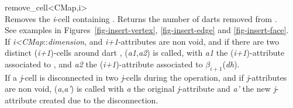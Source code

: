 \begin{ccRefFunction}{remove_cell<CMap,i>}
\\

{Removes the \emph{i}-cell containing . 
  Returns the number of darts removed from .
 \\
  See examples in Figures~\ref{fig-insert-vertex}, \ref{fig-insert-edge} and \ref{fig-insert-face}.  \\
%
   If \emph{i<CMap}::\emph{dimension}, and \emph{i+1}-attributes are
   non void, and if there are two distinct (\emph{i+1})-cells around dart
   , (\emph{a1},\emph{a2}) is
   called, with \emph{a1} the (\emph{i+1})-attribute associated to ,
   and \emph{a2} the (\emph{i+1})-attribute associated to $\beta_{i+1}$(\emph{dh}).\\
   If a \emph{j}-cell is disconnected in two \emph{j}-cells during the
   operation, and if \emph{j}-attributes are non void,
   (\emph{a},\emph{a'}) is called 
   with \emph{a} the original \emph{j}-attribute and \emph{a'} the new 
   \emph{j}-attribute created due to the disconnection.
}



\end{ccRefFunction}
